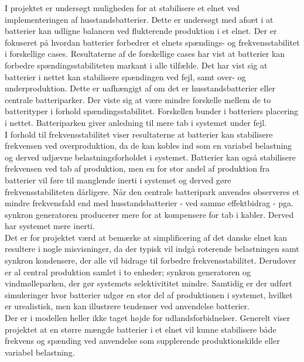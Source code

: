 
\label{Konklusion}
I projektet er undersøgt muligheden for at stabilisere et elnet ved implementeringen af husstandsbatterier. Dette er undersøgt med afsæt i at batterier kan udligne balancen ved flukterende produktion i et elnet. Der er fokuseret på hvordan batterier forbedrer et elnets spændings- og frekvensstabilitet i forskellige cases. Resultaterne af de forskellige cases har vist at batterier kan forbedre spændingsstabiliteten markant i alle tilfælde. Det har vist sig at batterier i nettet kan stabilisere spændingen ved fejl, samt over- og underproduktion. Dette er uafhængigt af om det er husstandsbatterier eller centrale batteriparker. Der viste sig at være mindre forskelle mellem de to batterityper i forhold spændingsstabilitet. Forskellen bunder i batteriers placering i nettet. Batteriparken giver anledning til mere tab i systemet under fejl.
\\

I forhold til frekvensstabilitet viser resultaterne at batterier kan stabilisere frekvensen ved overproduktion, da de kan kobles ind som en variabel belastning og derved udjævne belastningsforholdet i systemet.
Batterier kan også stabilisere frekvensen ved tab af produktion, men en for stor andel af produktion fra batterier vil føre til manglende inerti i systemet og derved gøre frekvensstabiliteten dårligere. Når den centrale batteripark anvendes observeres et mindre frekvensfald end med husstandsbatterier - ved samme effektbidrag - pga. synkron generatoren producerer mere for at kompensere for tab i kabler. Derved har systemet mere inerti.
\\

Det er for projektet værd at bemærke at simplificering af det danske elnet kan resultere i nogle misvisninger, da der typisk vil indgå roterende belastningen samt synkron kondensere, der alle vil bidrage til forbedre frekvensstabilitet. Derudover er al central produktion samlet i to enheder; synkron generatoren og vindmølleparken, der gør systemets selektivititet mindre. Samtidig er der udført simuleringer hvor batterier udgør en stor del af produktionen i systemet, hvilket er urealistisk, men kan illustrere tendenser ved anvendelse batterier. \\
Der er i modellen heller ikke taget højde for udlandsforbidnelser. Generelt viser projektet at en større mængde batterier i et elnet vil kunne stabilisere både frekvens og spænding ved anvendelse som supplerende produktionskilde eller variabel belastning.

